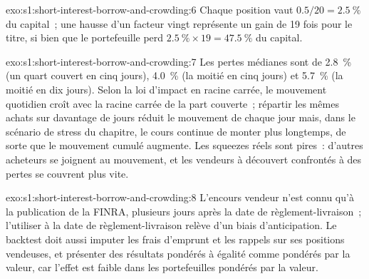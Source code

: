 \begin{solution}{exo:s1:short-interest-borrow-and-crowding:6}
Chaque position vaut $0.5/20 = 2.5~\%$ du capital~; une hausse d'un facteur vingt représente un gain de 19 fois pour le titre, si bien que le portefeuille perd $2.5~\% \times 19 = 47.5~\%$ du capital.
\end{solution}

\begin{solution}{exo:s1:short-interest-borrow-and-crowding:7}
Les pertes médianes sont de 2.8~\% (un quart couvert en cinq jours), 4.0~\% (la moitié en cinq jours) et 5.7~\% (la moitié en dix jours). Selon la loi d'impact en racine carrée, le mouvement quotidien
croît avec la racine carrée de la part couverte~; répartir les mêmes achats sur davantage de jours réduit le mouvement de chaque jour mais, dans le scénario de stress du chapitre, le
cours continue de monter plus longtemps, de sorte que le mouvement cumulé augmente. Les squeezes réels sont pires~: d'autres acheteurs se joignent au mouvement, et les vendeurs à découvert confrontés à des pertes se couvrent plus vite.
\end{solution}

\begin{solution}{exo:s1:short-interest-borrow-and-crowding:8}
L'encours vendeur n'est connu qu'à la publication de la FINRA, plusieurs jours après la date de règlement-livraison~; l'utiliser à la date de règlement-livraison relève d'un biais d'anticipation. Le backtest doit aussi
imputer les frais d'emprunt et les rappels sur ses positions vendeuses, et présenter des résultats pondérés à égalité comme pondérés par la valeur, car l'effet est faible dans les portefeuilles pondérés par la valeur.
\end{solution}

